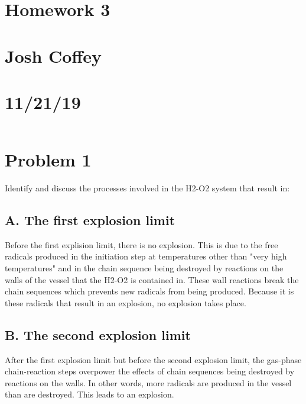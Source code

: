 \documentclass{article}
\begin{document}
\begin{center}
    \section*{Homework 3}
    \section*{Josh Coffey}
    \section*{11/21/19}
\end{center}

$$$$

\section*{Problem 1}
Identify and discuss the processes involved in the H2-O2 system that result in: \newline

\subsection*{A. The first explosion limit}
\indent Before the first explision limit, there is no explosion.  This is due to the free radicals produced in the initiation step at temperatures other than "very high temperatures" and in the chain sequence being destroyed by reactions on the walls of the vessel that the H2-O2 is contained in.  These wall reactions break the chain sequences which prevents new radicals from being produced.  Because it is these radicals that result in an explosion, no explosion takes place.\newline

\subsection*{B. The second explosion limit}
\indent After the first explosion limit but before the second explosion limit, the gas-phase chain-reaction steps overpower the effects of chain sequences being destroyed by reactions on the walls.  In other words, more radicals are produced in the vessel than are destroyed.  This leads to an explosion. \newline
\end{document}
